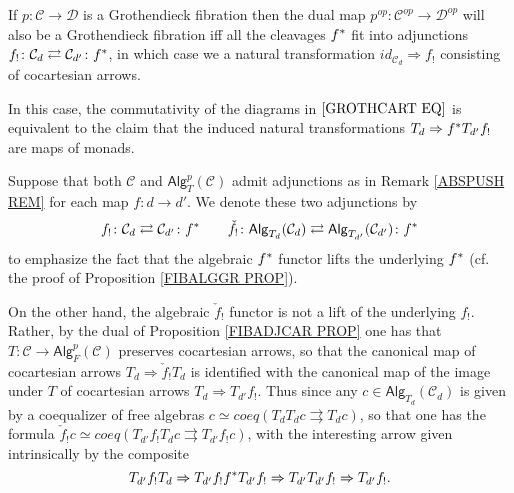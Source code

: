 \documentclass[a4paper,10pt
,draft
]{article}%
\renewcommand{\1}{\eta}%
\begin{document}
\begin{remark}\label{ABSPUSH REM}
      If $p\colon \mathcal{C} \to \mathcal{D}$
      is a Grothendieck fibration then the dual map
      $p^{op}\colon \mathcal{C}^{op} \to \mathcal{D}^{op}$
      will also be a Grothendieck fibration iff
      all the cleavages $f^{\**}$ fit into adjunctions
      $f_! \colon \mathcal{C}_d \rightleftarrows \mathcal{C}_{d'}\colon f^{\**}$,
      in which case we a natural transformation $id_{\mathcal C_d} \Rightarrow f_!$ consisting of cocartesian arrows.
      
      In this case,
      the commutativity of the diagrams in $\eqref{GROTHCART EQ}$
      is equivalent to the claim that the induced natural transformations
      $T_{d} \Rightarrow f^{\**}T_{d'}f_{!}$
      are maps of monads.
\end{remark}


\begin{remark}\label{ALGPUSHLL REM}
Suppose that both $\mathcal{C}$ and $\mathsf{Alg}_T^p(\mathcal{C})$
admit adjunctions as in 
Remark \ref{ABSPUSH REM} for each map $f\colon d \to d'$.
We denote these two adjunctions by
\[
f_! \colon \mathcal{C}_d \rightleftarrows \mathcal{C}_{d'}\colon f^{\**}
\qquad
\check{f}_! \colon \mathsf{Alg}_{T_d}(\mathcal{C}_d) 
\rightleftarrows 
\mathsf{Alg}_{T_{d'}}(\mathcal{C}_{d'})\colon f^{\**}
\]
to emphasize the fact that the algebraic $f^{\**}$ functor lifts the underlying $f^{\**}$ (cf. the proof of Proposition \ref{FIBALGGR PROP}).

On the other hand, the algebraic $\check{f}_!$ functor is not a lift of
the underlying $f_!$.
Rather, by the dual of Proposition \ref{FIBADJCAR PROP}
one has that $T \colon \mathcal{C} \to \mathsf{Alg}_F^p(\mathcal{C})$ preserves cocartesian arrows,
so that the canonical map of cocartesian arrows
$T_d \Rightarrow \check{f}_! T_d$
is identified with the canonical map of the image under $T$ of cocartesian arrows
$T_d \Rightarrow T_{d'} f_!$.
Thus since any 
$c \in \mathsf{Alg}_{T_d}(\mathcal{C}_d)$
is given by a coequalizer of free algebras
$c \simeq coeq(T_dT_d c \rightrightarrows T_d c)$,
so that one has the formula
$\check{f}_! c \simeq 
coeq(T_{d'}f_!T_d c \rightrightarrows T_{d'}f_! c)$,
{\color{OliveGreen} with the interesting arrow given intrinsically by the composite
  \[
        T_{d'} f_! T_d \Rightarrow T_{d'} f_! f^{\**} T_{d'} f_! \Rightarrow T_{d'} T_{d'} f_! \Rightarrow T_{d'} f_!.
  \]
}
\end{remark}
\end{document}
